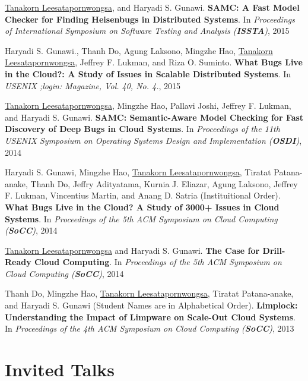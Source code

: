 \documentclass[10pt]{article} %
\begin{document}
\underline{Tanakorn Leesatapornwongsa}, and Haryadi S. Gunawi. \textbf{SAMC: A
Fast Model Checker for Finding Heisenbugs in Distributed Systems}. In
\textit{Proceedings of International Symposium on Software Testing and Analysis
(\textbf{ISSTA})}, 2015
\vspace{2mm}

Haryadi S. Gunawi., Thanh Do, Agung Laksono, Mingzhe Hao, \underline{Tanakorn
Leesatapornwongsa}, Jeffrey F. Lukman, and Riza O. Suminto.  \textbf{What Bugs
Live in the Cloud?: A Study of Issues in Scalable Distributed Systems}. In
\textit{USENIX ;login: Magazine, Vol. 40, No. 4.}, 2015 
\vspace{2mm}

\underline{Tanakorn Leesatapornwongsa}, Mingzhe Hao, Pallavi Joshi, Jeffrey F.
Lukman, and Haryadi S. Gunawi. \textbf{SAMC: Semantic-Aware Model Checking for
Fast Discovery of Deep Bugs in Cloud Systems}. In \textit{Proceedings of the
11th USENIX Symposium on Operating Systems Design and Implementation (\textbf{OSDI})},
2014
\vspace{2mm}

Haryadi S. Gunawi, Mingzhe Hao, \underline{Tanakorn Leesatapornwongsa}, Tiratat
Patana-anake, Thanh Do, Jeffry Adityatama, Kurnia J. Eliazar, Agung Laksono,
Jeffrey F. Lukman, Vincentius Martin, and Anang D. Satria (Instituitional Order).
\textbf{What Bugs Live in the Cloud? A Study of 3000+ Issues in Cloud Systems}.
In \textit{Proceedings of the 5th ACM Symposium on Cloud Computing (\textbf{SoCC})}, 2014
\vspace{2mm}

\underline{Tanakorn Leesatapornwongsa} and Haryadi S. Gunawi. \textbf{The Case
for Drill-Ready Cloud Computing}. In \textit{Proceedings of the 5th ACM
Symposium on Cloud Computing (\textbf{SoCC})}, 2014
\vspace{2mm}

Thanh Do, Mingzhe Hao, \underline{Tanakorn Leesatapornwongsa}, Tiratat
Patana-anake, and Haryadi S. Gunawi (Student Names are in Alphabetical Order).
\textbf{Limplock: Understanding the Impact of Limpware on Scale-Out Cloud
Systems}. In \textit{Proceedings of the 4th ACM Symposium on Cloud Computing
(\textbf{SoCC})}, 2013


\section{Invited Talks}
\end{document}
